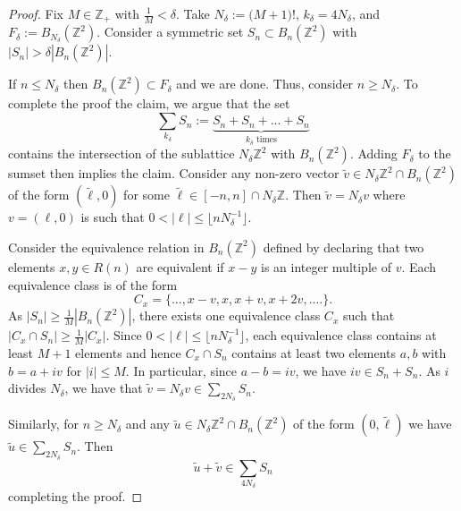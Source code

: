 \documentclass[10pt,reqno]{amsart}
\theoremstyle{Theorem}
\theoremstyle{definition}
\theoremstyle{remark}
\newcommand{\td}{\tilde}
\newcommand{\Z}{\mathbb {Z}}
\newcommand{\inv}{^{-1}}
\begin{document}
\begin{proof}
Fix $M\in \Z_+$ with $\frac 1 M<\delta$.
Take    $N_{\delta} := \big( M + 1 \big)!$, $k_\delta = 4 N_\delta$, and $F_{\delta} := B_{N_{\delta}}(\Z^2).$
Consider a symmetric set $S_n \subset B_n (\Z^2)$ with $|S_n| > \delta |B_n(\Z^2)|$.

If $n\le N_\delta$ then $B_n (\Z^2)\subset F_\delta$ and we are done.  Thus, consider $n\ge N_\delta$.  To complete the proof the claim, we argue that the set
$$\sum_{k_\delta} S_n := \underbrace{S_n + S_n + ... + S_n}_{\text{$k_{\delta}$ times}}$$ contains the intersection of  the sublattice $N_\delta \Z^2$ with $B_n(\Z^2)$.  Adding $F_\delta$ to the sumset then implies the claim.
  Consider any  non-zero vector
$\td v\in N_\delta \Z^2\cap B_n(\Z^2)$ of the form $(\td \ell, 0)$ for some $\td \ell \in [-n,n]\cap N_\delta \Z$.
Then $\td v = N_\delta v$ where $v= (\ell,0)$ is such that $0< |\ell |\le \lfloor n N_\delta\inv \rfloor$.

Consider the equivalence relation in $B_n(\Z^2)$ defined by declaring that two elements $x,y \in R(n)$ are equivalent if $x-y$ is an integer multiple of $v$.
Each equivalence class is of the form $$C_x = \{ ...,x - v, x, x + v, x + 2v,....\}.$$
As  $|S_n| \geq \frac{1}{M} |B_n(\Z^2)|$, there exists  one equivalence class $C_x$  such that $|C_x \cap S_n| \geq \frac{1}{M} |C_x|$.
Since $0< |\ell |\le \lfloor n N_\delta\inv \rfloor$, each equivalence class contains at least $M+1$ elements and hence $C_x \cap S_n$ contains at least two elements $a,b$ with $b= a + i v $ for $|i|\le M$.
In particular, since  $a-b = iv$, we have $iv \in S_n + S_n$.  As $i$ divides $N_{\delta}$, we have that $\td v = N_{\delta}v \in  \sum_{2N_{\delta}} S_n$.

Similarly, for $n\ge N_\delta$ and any  $\td u\in N_\delta \Z^2\cap B_n(\Z^2)$ of the form $(0, \td \ell)$  we have
$\td u \in  \sum_{2N_{\delta}} S_n$.  Then $$\td u  + \td v\in \sum_{4N_{\delta}} S_n$$
completing the proof. \end{proof}




%
\end{document}
